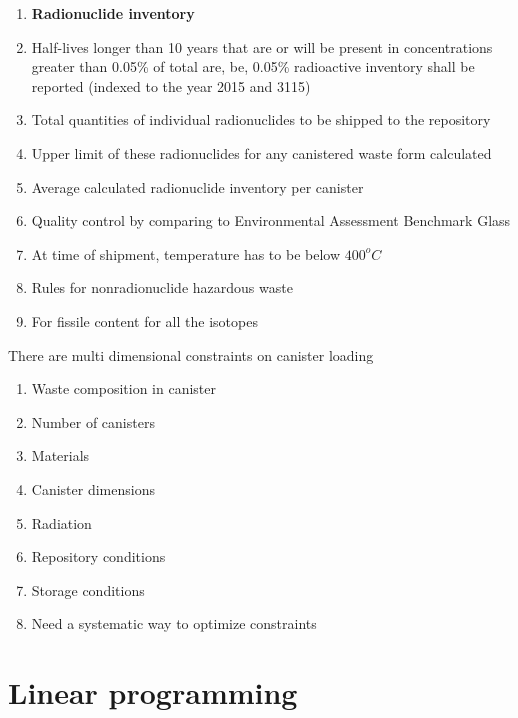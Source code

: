 \documentclass[aspectratio=1610,pdftex,dvipsnames,compress,xcolor={dvipsnames}]{beamer}
\begin{document}
\begin{frame}[t]{}
    \begin{enumerate}[series=outerlist,topsep=0pt,itemsep=7pt,leftmargin=*,label=(\arabic*)]
        \item[]\textbf{Radionuclide inventory}
        \item[]Half-lives longer than 10 years that are or will be present in concentrations greater than 0.05\% of total are, be, 0.05\% radioactive inventory shall be reported (indexed to the year 2015 and 3115)
        \item[]Total quantities of individual radionuclides to be shipped to the repository
        \item[]Upper limit of these radionuclides for any canistered waste form calculated
        \item[]Average calculated radionuclide inventory per canister
        \item[]Quality control by comparing to Environmental Assessment Benchmark Glass
        \item[]At time of shipment, temperature has to be below $400^oC$
        \item[]Rules for nonradionuclide hazardous waste
        \item[]For fissile content for all the isotopes
    \end{enumerate}
\end{frame}


\begin{frame}{There are multi dimensional constraints on canister loading}
    \begin{enumerate}[series=outerlist,topsep=0pt,itemsep=21pt,leftmargin=*,label=(\arabic*)]
        \item[]Waste composition in canister
        \item[]Number of canisters
        \item[]Materials
        \item[]Canister dimensions
        \item[]Radiation
        \item[]Repository conditions
        \item[]Storage conditions
            \vspace{0.15in}
        \item[]Need a systematic way to optimize constraints
    \end{enumerate}
\end{frame}


\section{Linear programming}
\end{document}
